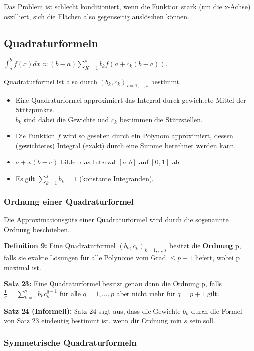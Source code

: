 \documentclass[a4paper]{article}
\begin{document}
Das Problem ist schlecht konditioniert, wenn die Funktion stark (um die x-Achse)
oszilliert, sich die Flächen also gegenseitig auslöschen können.

\subsection{Quadraturformeln}

$\int_a^b f(x) dx \approx (b - a) \sum\limits_{K = 1}^s b_k f(a + c_k(b - a))$.

Quadraturformel ist also durch $(b_k, c_k)_{k = 1, \dots, s}$ bestimmt.

\begin{itemize}
    \item Eine Quadraturformel approximiert das Integral durch gewichtete Mittel
    der Stützpunkte.\\ $b_k$ sind dabei die Gewichte und $c_k$ bestimmen die
    Stützstellen.
    \item Die Funktion $f$ wird so gesehen durch ein Polynom approximiert,
    dessen (gewichtetes) Integral (exakt) durch eine Summe berechnet werden
    kann.
    \item $a +  x (b - a)$ bildet das Interval $[a, b]$ auf $[0, 1]$ ab.
    \item Es gilt $\sum\limits_{k = 1}^s b_k = 1$ (konstante Integranden).
\end{itemize}


\subsubsection{Ordnung einer Quadraturformel}

Die Approximationsgüte einer Quadraturformel wird durch die sogenannte Ordnung
beschrieben.

\textbf{Definition 9:} Eine Quadraturformel $(b_k, c_k)_{k = 1, \dots,s}$
besitzt die \textbf{Ordnung} p, falls sie exakte Lösungen für alle Polynome vom
Grad $\le p - 1$ liefert, wobei p maximal ist.

\textbf{Satz 23:} Eine Quadraturformel besitzt genau dann die Ordnung p, falls
$\frac{1}{q} = \sum\limits_{k = 1}^s b_k c_k^{q - 1}$ für alle $q = 1, \dots, p$
aber nicht mehr für $q = p + 1$ gilt.

\textbf{Satz 24 (Informell):} Satz 24 sagt aus, dass die Gewichte $b_k$ durch
die Formel von Satz 23 eindeutig bestimmt ist, wenn dir Ordnung min $s$ sein
soll.

\subsubsection{Symmetrische Quadraturformeln}
\end{document}
